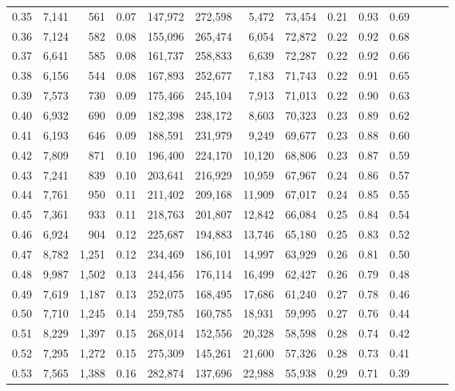 \begin{tabular}{rrrrrrrrrrrrrr}
0.35 &  7,141 &    561 &  0.07 &  147,972 &  272,598 &   5,472 &  73,454 &  0.21 &  0.93 &      0.69 \\
0.36 &  7,124 &    582 &  0.08 &  155,096 &  265,474 &   6,054 &  72,872 &  0.22 &  0.92 &      0.68 \\
0.37 &  6,641 &    585 &  0.08 &  161,737 &  258,833 &   6,639 &  72,287 &  0.22 &  0.92 &      0.66 \\
0.38 &  6,156 &    544 &  0.08 &  167,893 &  252,677 &   7,183 &  71,743 &  0.22 &  0.91 &      0.65 \\
0.39 &  7,573 &    730 &  0.09 &  175,466 &  245,104 &   7,913 &  71,013 &  0.22 &  0.90 &      0.63 \\
0.40 &  6,932 &    690 &  0.09 &  182,398 &  238,172 &   8,603 &  70,323 &  0.23 &  0.89 &      0.62 \\
0.41 &  6,193 &    646 &  0.09 &  188,591 &  231,979 &   9,249 &  69,677 &  0.23 &  0.88 &      0.60 \\
0.42 &  7,809 &    871 &  0.10 &  196,400 &  224,170 &  10,120 &  68,806 &  0.23 &  0.87 &      0.59 \\
0.43 &  7,241 &    839 &  0.10 &  203,641 &  216,929 &  10,959 &  67,967 &  0.24 &  0.86 &      0.57 \\
0.44 &  7,761 &    950 &  0.11 &  211,402 &  209,168 &  11,909 &  67,017 &  0.24 &  0.85 &      0.55 \\
0.45 &  7,361 &    933 &  0.11 &  218,763 &  201,807 &  12,842 &  66,084 &  0.25 &  0.84 &      0.54 \\
0.46 &  6,924 &    904 &  0.12 &  225,687 &  194,883 &  13,746 &  65,180 &  0.25 &  0.83 &      0.52 \\
0.47 &  8,782 &  1,251 &  0.12 &  234,469 &  186,101 &  14,997 &  63,929 &  0.26 &  0.81 &      0.50 \\
0.48 &  9,987 &  1,502 &  0.13 &  244,456 &  176,114 &  16,499 &  62,427 &  0.26 &  0.79 &      0.48 \\
0.49 &  7,619 &  1,187 &  0.13 &  252,075 &  168,495 &  17,686 &  61,240 &  0.27 &  0.78 &      0.46 \\
0.50 &  7,710 &  1,245 &  0.14 &  259,785 &  160,785 &  18,931 &  59,995 &  0.27 &  0.76 &      0.44 \\
0.51 &  8,229 &  1,397 &  0.15 &  268,014 &  152,556 &  20,328 &  58,598 &  0.28 &  0.74 &      0.42 \\
0.52 &  7,295 &  1,272 &  0.15 &  275,309 &  145,261 &  21,600 &  57,326 &  0.28 &  0.73 &      0.41 \\
0.53 &  7,565 &  1,388 &  0.16 &  282,874 &  137,696 &  22,988 &  55,938 &  0.29 &  0.71 &      0.39 \\

\end{tabular}
